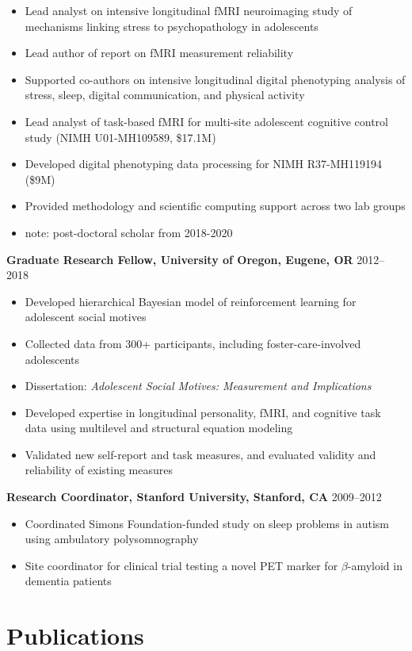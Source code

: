 \documentclass[
  10pt,
  letterpaper,
  DIV=11,
  numbers=noendperiod]{scrartcl}
\providecommand{\tightlist}{%
  \setlength{\itemsep}{0pt}\setlength{\parskip}{0pt}}\usepackage{longtable,booktabs,array}
\newcommand{\entry}[2]{%
  \noindent \textbf{#1} \hfill {\small #2}
}
\begin{document}
\begin{itemize}
\tightlist
\item
  Lead analyst on intensive longitudinal fMRI neuroimaging study of
  mechanisms linking stress to psychopathology in adolescents
\item
  Lead author of report on fMRI measurement reliability
\item
  Supported co-authors on intensive longitudinal digital phenotyping
  analysis of stress, sleep, digital communication, and physical
  activity
\item
  Lead analyst of task-based fMRI for multi-site adolescent cognitive
  control study (NIMH U01-MH109589, \$17.1M)
\item
  Developed digital phenotyping data processing for NIMH R37-MH119194
  (\$9M)
\item
  Provided methodology and scientific computing support across two lab
  groups
\item
  note: post-doctoral scholar from 2018-2020
\end{itemize}

\entry{Graduate Research Fellow, University of Oregon, Eugene, OR}{2012–2018}

\begin{itemize}
\tightlist
\item
  Developed hierarchical Bayesian model of reinforcement learning for
  adolescent social motives
\item
  Collected data from 300+ participants, including foster-care-involved
  adolescents
\item
  Dissertation: \emph{Adolescent Social Motives: Measurement and
  Implications}
\item
  Developed expertise in longitudinal personality, fMRI, and cognitive
  task data using multilevel and structural equation modeling
\item
  Validated new self-report and task measures, and evaluated validity
  and reliability of existing measures
\end{itemize}

\entry{Research Coordinator, Stanford University, Stanford, CA}{2009–2012}

\begin{itemize}
\tightlist
\item
  Coordinated Simons Foundation-funded study on sleep problems in autism
  using ambulatory polysomnography
\item
  Site coordinator for clinical trial testing a novel PET marker for
  \(\beta\)-amyloid in dementia patients
\end{itemize}

\section{Publications}\label{publications}

\printbibliography[heading=none]
\end{document}
